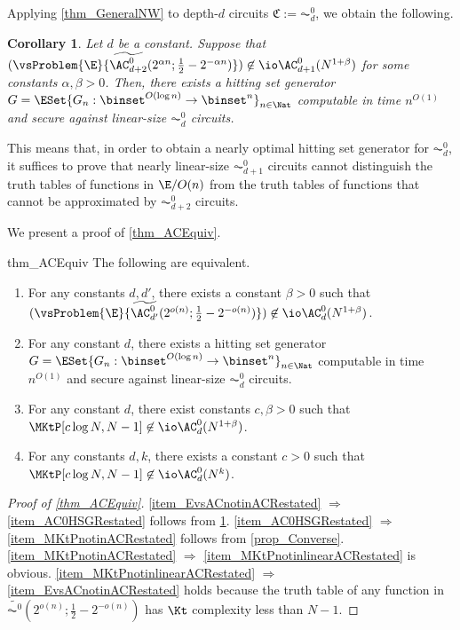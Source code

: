 \documentclass[11pt]{article}
\numberwithin{equation}{section}
\newtheorem{corollary}[theorem]{Corollary}
\theoremstyle{definition}
\theoremstyle{plain}
\begin{document}
Applying \cref{thm_GeneralNW} to depth-$d$ circuits $\mathfrak{C} := \AC^0_d$,
we obtain the following.
\begin{corollary}
  \label{cor_NWAC0}
  Let $d$ be a constant.
  Suppose that
  $(\vsProblem{\E}{\widetilde{\AC^{0}_{d+2}} (2^{\alpha n} ; \frac{1}{2} - 2^{- \alpha n})} ) \not\in \io \AC^0_{d+1} (N^{1 + \beta})$
  for some constants $\alpha, \beta > 0$.
  Then,
  there exists a hitting set generator $G = \ESet{ G_n : \binset^{O(\log n)} \to \binset^n }_{n \in \Nat} $ computable in time $n^{O(1)}$ and secure against linear-size $\AC^0_{d}$ circuits.
\end{corollary}
This means that, in order to obtain a nearly optimal hitting set generator for $\AC^0_d$,
it suffices to prove that nearly linear-size $\AC^0_{d+1}$ circuits cannot distinguish the truth tables of functions in $\E/O(n)$
from the truth tables of functions that cannot be approximated by $\AC^0_{d+2}$ circuits.

We present a proof of \cref{thm_ACEquiv}.
\begin{restatetheorem}
  {thm_ACEquiv}
  The following are equivalent.
  \begin{enumerate}
    \item
          \label{item_EvsACnotinACRestated}
          For any constants $d, d'$,
          there exists a constant $\beta > 0$ such that
          $(\vsProblem{\E}{\widetilde{\AC_{d'}^0} (2^{o( n)} ; \frac{1}{2} - 2^{- o(n)})}) \not\in \io\AC^0_d(N^{1 + \beta})$.
    \item
          \label{item_AC0HSGRestated}
          For any constant $d$,
          there exists a hitting set generator $G = \ESet{ G_n : \binset^{O(\log n)} \to \binset^n }_{n \in \Nat} $ computable in time $n^{O(1)}$ and secure against linear-size $\AC_d^0$ circuits.
    \item
          \label{item_MKtPnotinlinearACRestated}
          For any constant $d$, there exist constants $c, \beta > 0$ such that
          $\MKtP[c \log N, N - 1] \not\in \io \AC_d^0(N^{1 + \beta})$.
    \item
          \label{item_MKtPnotinACRestated}
          For any constants $d, k$, there exists a constant $c > 0$ such that
          $\MKtP[c \log N, N - 1] \not\in \io \AC_d^0(N^{k})$.
  \end{enumerate}
\end{restatetheorem}


\begin{proof}
  [Proof of \cref{thm_ACEquiv}]
  \cref{item_EvsACnotinACRestated} $\Longrightarrow$
  \cref{item_AC0HSGRestated}
  follows from \cref{cor_NWAC0}.
  \cref{item_AC0HSGRestated}
  $\Longrightarrow$
  \cref{item_MKtPnotinACRestated}
  follows from \cref{prop_Converse}.
  \cref{item_MKtPnotinACRestated}
  $\Longrightarrow$
  \cref{item_MKtPnotinlinearACRestated}
  is obvious.
  \cref{item_MKtPnotinlinearACRestated}
  $\Longrightarrow$
  \cref{item_EvsACnotinACRestated}
  holds because the truth table of any function in $\widetilde{\AC^0}(2^{o(n)}; \frac{1}{2} - 2^{- o(n)})$
  has $\Kt$ complexity less than $N - 1$.
\end{proof}
\end{document}
